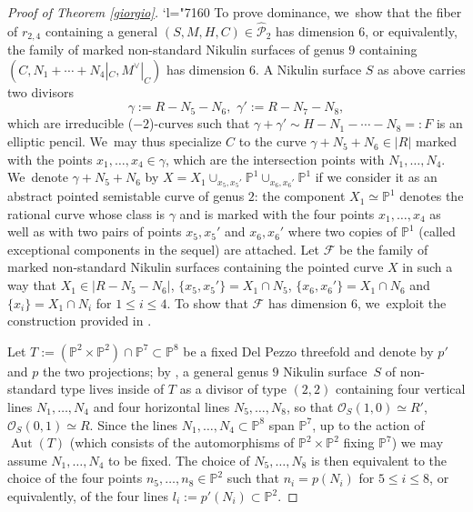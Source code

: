 \documentclass[11pt]{article}
\newcommand{\Changel}{\mathcode`l="7160}
\theoremstyle{plain}
\theoremstyle{definition}
\DeclareMathOperator{\Aut}{Aut}
\newcommand\PP{{\mathbb P}}
\newcommand\F{{\mathcal F}}
\renewcommand\O{{\mathcal O}}
\renewcommand\P{{\mathcal P}}
\begin{document}
\begin{proof}[Proof of Theorem \ref{giorgio}]
\Changel
To prove dominance, we~show that the fiber of $r_{2,4} $ containing a general $(S,M,H,C)\in\widehat\P_{2}$ has dimension $6$, or equivalently, the family of marked non-standard Nikulin surfaces of genus $9$ containing $(C,N_1+\cdots +N_4|_C,M^\vee|_C)$ has dimension $6$. A Nikulin surface $S$ as above carries two divisors\vspace*{-3pt}
\begin{equation*}
\gamma:=R-N_5-N_6,\,\,\gamma':=R-N_7-N_8,
\end{equation*}
which are irreducible ($-2$)-curves such that $\gamma+\gamma'\sim H-N_1-\cdots-N_8=:F$ is an elliptic pencil. We~may thus specialize $C$ to the curve $\gamma+N_5+N_6\in |R|$ marked with the points $x_1,\ldots,x_4\in \gamma$, which are the intersection points with $N_1,\ldots, N_4$. We~denote $\gamma+N_5+N_6$ by $X=X_1\cup_{x_5,x_5'}\PP^1\cup_{x_6,x_6'}\PP^1$ if we consider it as an abstract pointed semistable curve of genus $2$: the component $X_1\simeq\PP^1$ denotes the rational curve whose class is $\gamma$ and is marked with the four points $x_1,\ldots,x_4$ as well as with two pairs of points $x_5,x_5'$ and $x_6,x_6'$ where two copies of $\PP^1$ (called exceptional components in the sequel) are attached. Let $\F$ be the family of marked non-standard Nikulin surfaces containing the pointed curve $X$ in such a way that $X_1\in |R-N_5-N_6|$, $\{x_5,x_5'\}=X_1\cap N_5$, $\{x_6,x_6'\}=X_1\cap N_6$ and $\{x_i\}=X_1\cap N_i$ for $1\leq i\leq 4$. To show that $\F$ has dimension $6$, we~exploit the construction provided in \cite[\S 4]{KLV2}.

Let $T:=(\PP^2\times \PP^2)\cap\PP^7\subset\PP^8$ be a fixed Del Pezzo threefold and denote by $p'$ and $p$ the two projections; by \cite[Prop.\,4.3]{KLV2}, a general genus $9$ Nikulin surface~$S$ of non-standard type lives inside of $T$ as a divisor of type $(2,2)$ containing four vertical lines $N_1,\ldots, N_4$ and four horizontal lines $N_5,\ldots, N_8$, so that $\O_S(1,0)\simeq R'$, $\O_S(0,1)\simeq R$. Since the lines $N_1,\ldots, N_4\subset \PP^8$ span $\PP^7$, up to the action of $\Aut(T)$ (which consists of the automorphisms of $\PP^2\times \PP^2$ fixing $\PP^7$) we may assume $N_1,\ldots, N_4$ to be fixed. The choice of $N_5,\ldots,N_8$ is then equivalent to the choice of the four points $n_5,\ldots, n_8\in \PP^2$ such that $n_i=p(N_i)$ for $5\leq i\leq 8$, or equivalently, of the four lines $l_i:=p'(N_i)\subset\PP^2$.\enlargethispage{.5\baselineskip}%


\end{proof}
\end{document}
